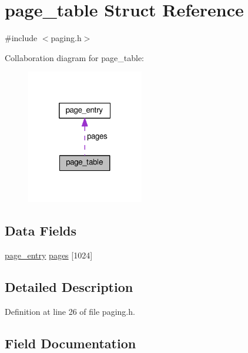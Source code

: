 \hypertarget{structpage__table}{}\section{page\+\_\+table Struct Reference}
\label{structpage__table}


{\ttfamily \#include $<$paging.\+h$>$}



Collaboration diagram for page\+\_\+table\+:\nopagebreak
\begin{figure}[H]
\begin{center}
\leavevmode
\includegraphics[width=145pt]{structpage__table__coll__graph}
\end{center}
\end{figure}
\subsection*{Data Fields}
\begin{DoxyCompactItemize}
\item 
\hyperlink{structpage__entry}{page\+\_\+entry} \hyperlink{structpage__table_aa066e0fa847ce2fafb6a2feddfa340ff}{pages} \mbox{[}1024\mbox{]}
\end{DoxyCompactItemize}


\subsection{Detailed Description}


Definition at line 26 of file paging.\+h.



\subsection{Field Documentation}

